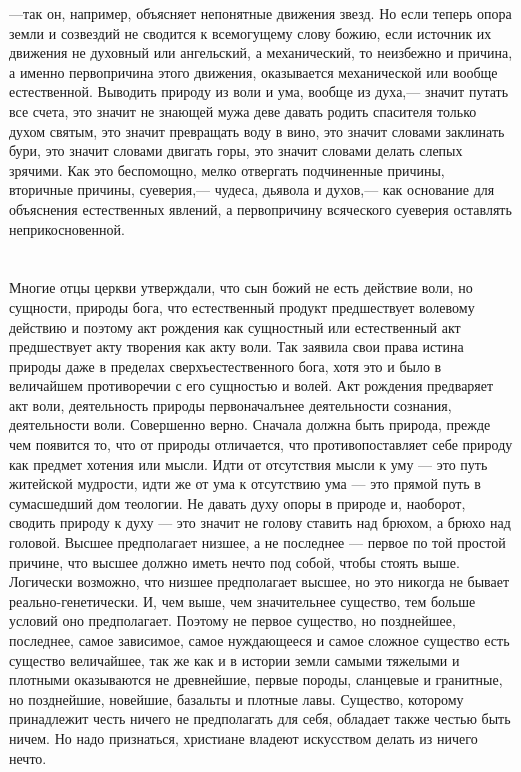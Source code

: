 \documentclass[12pt]{article}
\begin{document}
---так он, например, объясняет непонятные движения звезд. Но если теперь опора земли и созвездий не сводится к всемогущему слову божию, если источник их движения не духовный или ангельский, а механический, то неизбежно и причина, а именно первопричина этого движения, оказывается механической или вообще естественной. Выводить природу из воли и ума, вообще из духа,--- значит путать все счета, это значит не знающей мужа деве давать родить спасителя только духом святым, это значит превращать воду в вино, это значит словами заклинать бури, это значит словами двигать горы, это значит словами делать слепых зрячими. Как это беспомощно, мелко отвергать подчиненные причины, вторичные причины, суеверия,--- чудеса, дьявола и духов,--- как основание для объяснения естественных явлений, а первопричину всяческого суеверия оставлять неприкосновенной.



\section{}

Многие отцы церкви утверждали, что сын божий не есть действие воли, но сущности, природы бога, что естественный продукт предшествует волевому действию и поэтому акт рождения как сущностный или естественный акт предшествует акту творения как акту воли. Так заявила свои права истина природы даже в пределах сверхъестественного бога, хотя это и было в величайшем противоречии с его сущностью и волей. Акт рождения предваряет акт воли, деятельность природы первоначалънее деятельности сознания, деятельности воли. Совершенно верно. Сначала должна быть природа, прежде чем появится то, что от природы отличается, что противопоставляет себе природу как предмет хотения или мысли. Идти от отсутствия мысли к уму --- это путь житейской мудрости, идти же от ума к отсутствию ума --- это прямой путь в сумасшедший дом теологии. Не давать духу опоры в природе и, наоборот, сводить природу к духу --- это значит не голову ставить над брюхом, а брюхо над головой. Высшее предполагает низшее, а не последнее --- первое по той простой причине, что высшее должно иметь нечто под собой, чтобы стоять выше. Логически возможно, что низшее предполагает высшее, но это никогда не бывает реально-генетически. И, чем выше, чем значительнее существо, тем больше условий оно предполагает. Поэтому не первое существо, но позднейшее, последнее, самое зависимое, самое нуждающееся и самое сложное существо есть существо величайшее, так же как и в истории земли самыми тяжелыми и плотными оказываются не древнейшие, первые породы, сланцевые и гранитные, но позднейшие, новейшие, базальты и плотные лавы. Существо, которому принадлежит честь ничего не предполагать для себя, обладает также честью быть ничем. Но надо признаться, христиане владеют искусством делать из ничего нечто.
\end{document}
